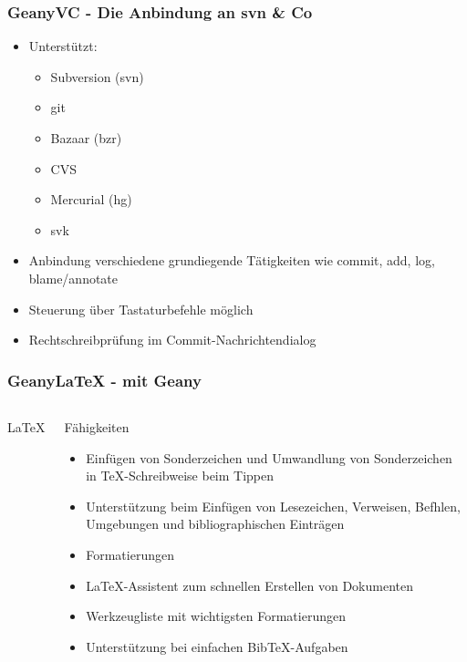 \begin{frame}
  \frametitle{GeanyVC - Die Anbindung an svn \& Co}
  \begin{block}{}
    \begin{itemize}
    \item Unterstützt:
      \begin{itemize}
      \item Subversion (svn)
      \item git
      \item Bazaar (bzr)
      \item CVS
      \item Mercurial (hg)
      \item svk
      \end{itemize}
    \item Anbindung verschiedene grundiegende Tätigkeiten wie commit,
      add, log, blame/annotate
    \item Steuerung über Tastaturbefehle möglich
    \item Rechtschreibprüfung im Commit-Nachrichtendialog
    \end{itemize}
  \end{block}
\end{frame}

\begin{frame}
  \frametitle{Geany\LaTeX{} - \LaTeXe mit Geany}
  \begin{columns}[c]
    \column[c]{1.5cm} \huge \LaTeX
    \column{8.5cm} \normalsize
    \begin{block}{Fähigkeiten}
      \begin{itemize}
      \item Einfügen von Sonderzeichen und Umwandlung von
        Sonderzeichen in \TeX-Schreibweise beim Tippen
      \item Unterstützung beim Einfügen von Lesezeichen, Verweisen,
        Befhlen, Umgebungen und bibliographischen Einträgen
      \item Formatierungen
      \item \LaTeX-Assistent zum schnellen Erstellen von Dokumenten
      \item Werkzeugliste mit wichtigsten Formatierungen
      \item Unterstützung bei einfachen BibTeX-Aufgaben
      \end{itemize}
    \end{block}
  \end{columns}
\end{frame}

